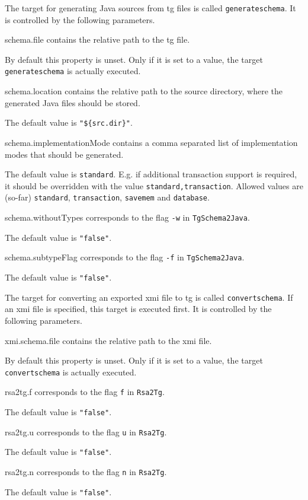 \documentclass[a4paper,twoside,11pt,bibtotoc]{article}
\begin{document}
The target for generating Java sources from tg files is called \texttt{generateschema}.
It is controlled by the following parameters.

\begin{description*}
	\item[schema.file] contains the relative path to the tg file.\par By default this property is unset. Only if it is set to a value, the target \texttt{generateschema} is actually executed.
	\item[schema.location] contains the relative path to the source directory, where the generated Java files should be stored.\par The default value is \texttt{"\$\{src.dir\}"}.
	\item[schema.implementationMode] contains a comma separated list of implementation modes that should be generated.\par The default value is \texttt{standard}. E.g. if additional transaction support is required, it should be overridden with the value \texttt{standard,transaction}. Allowed values are (so-far) \texttt{standard}, \texttt{transaction}, \texttt{savemem} and \texttt{database}.
	\item[schema.withoutTypes] corresponds to the flag \texttt{-w} in \texttt{TgSchema2Java}.\par The default value is \texttt{"false"}.
	\item[schema.subtypeFlag] corresponds to the flag \texttt{-f} in \texttt{TgSchema2Java}.\par The default value is \texttt{"false"}.
\end{description*}

The target for converting an exported xmi file to tg is called \texttt{convertschema}.
If an xmi file is specified, this target is executed first.
It is controlled by the following parameters.

\begin{description*}
	\item[xmi.schema.file] contains the relative path to the xmi file.\par By default this property is unset. Only if it is set to a value, the target \texttt{convertschema} is actually executed.
	\item[rsa2tg.f] corresponds to the flag \texttt{f} in \texttt{Rsa2Tg}.\par The default value is \texttt{"false"}.
	\item[rsa2tg.u] corresponds to the flag \texttt{u} in \texttt{Rsa2Tg}.\par The default value is \texttt{"false"}.
	\item[rsa2tg.n] corresponds to the flag \texttt{n} in \texttt{Rsa2Tg}.\par The default value is \texttt{"false"}.
\end{description*}
\end{document}
